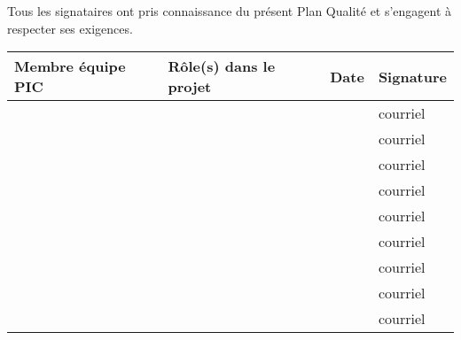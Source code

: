 Tous les signataires ont pris connaissance du présent Plan Qualité et s'engagent à respecter ses exigences. \\
	
	\vspace{1cm}

\begin{tabular}[h]{|p{}|p{}|p{}|p{}|}
	\hline
	
	\cellcolor{gray!40}Membre équipe PIC & \cellcolor{gray!40}Rôle(s) dans le projet & \cellcolor{gray!40}Date & \cellcolor{gray!40}Signature \\\hline
	\Sergi 		& \CP 				&  & courriel \\\hline
	\Pierre 		& \RQ \newline \CPA 	&  & courriel \\\hline
	\Michel 		& \D \newline \RD 	&  & courriel \\\hline
	\Kafui 		& \D \newline \RQA 	&  & courriel \\\hline
	\Matthieu 	& \D \newline \RRS 	&  & courriel \\\hline
	\Mathieu 	& \D \newline \RGC 	&  & courriel \\\hline
	\Florian 	& \D \newline \RS	&  & courriel \\\hline
	\Melissa 	& \D 				&  & courriel \\\hline
	\Julie		& \D 				&  & courriel \\\hline
\end{tabular}
